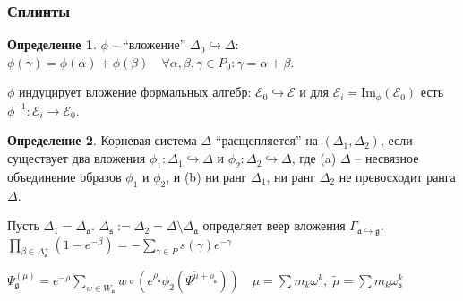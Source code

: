 \documentclass[pdftex]{beamer}
\newcommand{\gf}{\mathfrak{g}}
\newcommand{\af}{\mathfrak{a}}
\newcommand{\sfr}{\mathfrak{s}}
\theoremstyle{definition} \newtheorem{Def}{Определение}
\begin{document}
\begin{frame}
  \frametitle{Сплинты}
  \begin{Def}
$\phi $ -- ``вложение'' $\Delta_{0}\hookrightarrow \Delta$:
$\phi (\gamma )=\phi (\alpha )+\phi (\beta )\quad  \forall \alpha ,\beta ,\gamma \in P_{0}: \gamma =\alpha+\beta.$

\end{Def}
$\phi$ индуцирует вложение формальных алгебр: ${\mathcal{E}}_0\hookrightarrow \mathcal{E}$ и  для ${\mathcal{E}}_i=\mathrm{Im}_{\phi}\left( {\mathcal{E}}_0\right)$ есть $\phi^{-1}:{\mathcal{E}}_i \longrightarrow {\mathcal{E}}_0$.

\begin{Def}
Корневая система $\Delta$ ``расщепляется'' на  $(\Delta _{1},\Delta _{2})$, если существует два вложения  $\phi _{1}:\Delta _{1}\hookrightarrow \Delta $ и $\phi _{2}:\Delta _{2}\hookrightarrow \Delta $, где (a) $\Delta $ -- несвязное объединение образов $\phi _{1}$ и $\phi _{2}$, и (b) ни ранг  $\Delta _{1}$, ни ранг  $\Delta _{2}$ не превосходит ранга $\Delta $.
\end{Def}
Пусть $\Delta _{1}=\Delta _{\af}$. $\Delta _{\sfr}:=\Delta_{2}=\Delta \setminus \Delta _{\af}$ определяет  веер вложения  $\Gamma _{\af\hookrightarrow \gf}$. 
$\prod_{\beta \in \Delta _{\sfr}^{+}}\left( 1-e^{-\beta }\right)
=-\sum_{\gamma \in P}s(\gamma )e^{-\gamma }$

$\Psi _{\gf}^{\left( \mu \right) }=e^{-\rho}\sum_{w\in W_{\af}}w\circ \left(
e^{\rho _{\af}}\phi_{2}\left(\Psi ^{\widetilde{\mu }+\rho _{\sfr}}\right)\right) \quad \mu=\sum m_{k}\omega ^{k},\;\widetilde{\mu }=\sum m_{k}\omega _{\sfr}^{k}$

\end{frame}
\end{document}
